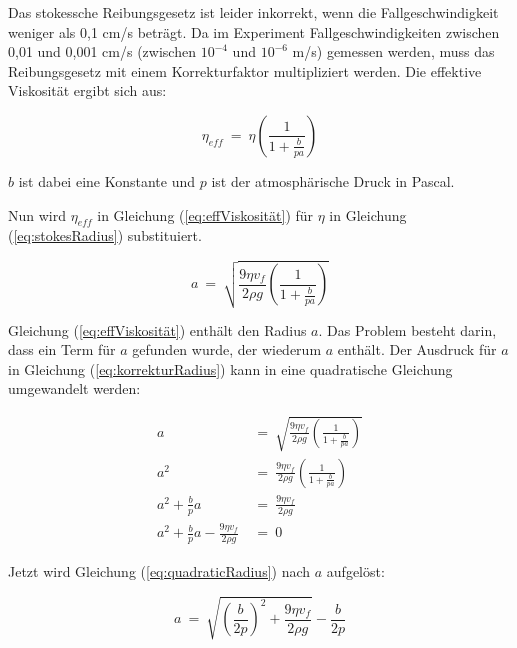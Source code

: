 \noindent Das stokessche Reibungsgesetz ist leider inkorrekt, wenn die Fallgeschwindigkeit weniger als 0,1 cm/s beträgt. Da im Experiment Fallgeschwindigkeiten zwischen 0,01 und 0,001 cm/s (zwischen $10^{-4}$ und $10^{-6}$ m/s) gemessen werden, muss das Reibungsgesetz mit einem Korrekturfaktor multipliziert werden. Die effektive Viskosität ergibt sich aus:

\begin{equation}\label{eq:effViskosität}
	\eta_{eff} \ = \ \eta \left( \frac{1}{1 + \frac{b}{pa}} \right) 
\end{equation}

\noindent $b$ ist dabei eine Konstante und $p$ ist der atmosphärische Druck in Pascal. 

\noindent Nun wird $\eta_{eff}$ in Gleichung (\ref{eq:effViskosität}) für $\eta$ in Gleichung (\ref{eq:stokesRadius}) substituiert.

\begin{equation}\label{eq:korrekturRadius}
	a \ = \ \sqrt{\frac{9\eta v_f}{2\rho g} \left( \frac{1}{1 + \frac{b}{pa}}\right)}
\end{equation}

\noindent Gleichung (\ref{eq:effViskosität}) enthält den Radius $a$. Das Problem besteht darin, dass ein Term für $a$ gefunden wurde, der wiederum $a$ enthält. Der Ausdruck für $a$ in Gleichung (\ref{eq:korrekturRadius}) kann in eine quadratische Gleichung umgewandelt werden:

\begin{equation}\label{eq:quadraticRadius}
	\begin{split}
		a & \ = \ \sqrt{\frac{9\eta v_f}{2\rho g} \left( \frac{1}{1 + \frac{b}{pa}}\right)} \\
		a^2 & \ = \ \frac{9\eta v_f}{2\rho g} \left( \frac{1}{1 + \frac{b}{pa}}\right) \\
		a^2 + \frac{b}{p}a & \ = \ \frac{9\eta v_f}{2\rho g} \\
		a^2 + \frac{b}{p}a - \frac{9\eta v_f}{2\rho g} & \ = \ 0
	\end{split}
\end{equation} 

\noindent Jetzt wird Gleichung (\ref{eq:quadraticRadius}) nach $a$ aufgelöst:

\begin{equation}\label{eq:qRadius}
	a \ = \ \sqrt{\left( \frac{b}{2p}\right)^2 + \frac{9\eta v_f}{2\rho g}} - \frac{b}{2p}
\end{equation}


